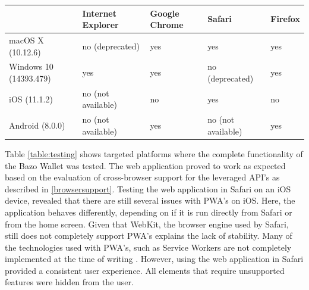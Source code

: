 \begin{center}
    \begin{tabular}{ | l | l | l | l | p{2cm} |}
    \hline
      & Internet Explorer & Google Chrome & Safari & Firefox \\ \hline
    macOS X (10.12.6)  & no (deprecated) & yes & yes & yes \\ \hline
    Windows 10 (14393.479)  & yes & yes & no (deprecated) & yes \\ \hline    
    iOS (11.1.2)  & no (not available) & no & yes & no \\ \hline
    Android (8.0.0)  & no (not available) & yes & no (not available) & yes \\ \hline
    \end{tabular}
    \label{table:testing}
    \end{center}
Table \ref{table:testing} shows targeted platforms where the complete functionality of the Bazo Wallet was tested. The web application proved to work as expected based on the evaluation of cross-browser support for the leveraged API's as described in \ref{browsersupport}. Testing the web application in Safari on an iOS device, revealed that there are still several issues with PWA's on iOS. Here, the application behaves differently, depending on if it is run directly from Safari or from the home screen. Given that WebKit, the browser engine used by Safari, still does not completely support PWA's explains the lack of stability. Many of the technologies used with PWA's, such as Service Workers are not completely implemented at the time of writing \cite{webkitsw}. However, using the web application in Safari provided a consistent user experience. All elements that require unsupported features were hidden from the user.
 
